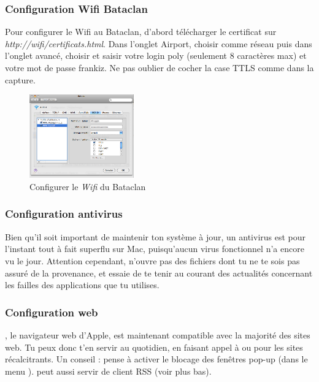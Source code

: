 
\subsubsection{Configuration Wifi Bataclan}
Pour configurer le Wifi au Bataclan, d'abord télécharger le certificat sur \emph{http://wifi/certificats.html}.
Dans l'onglet Airport, choisir comme réseau  puis dans l'onglet avancé, choisir  et saisir votre login poly (seulement 8 caractères max) et votre mot de passe frankiz. Ne pas oublier de cocher la case TTLS comme dans la capture.

\begin{figure}[!hl]
    \begin{center}
      \includegraphics[width=0.4\textwidth]{images/mac_config_wifi.png} 
      \caption{Configurer le \emph{Wifi} du Bataclan}
    \end{center}
  \end{figure}


\subsubsection{Configuration antivirus}

Bien qu'il soit important de maintenir ton système à jour, un antivirus est pour l'instant tout à fait superflu sur Mac, puisqu'aucun virus fonctionnel n'a encore vu le jour. Attention cependant, n'ouvre pas des fichiers dont tu ne te sois pas assuré de la provenance, et essaie de te tenir au courant des actualités concernant les failles des applications que tu utilises.


\subsubsection{Configuration web}

 , le navigateur web d'Apple, est maintenant compatible avec la majorité des sites web. Tu peux donc t'en servir au quotidien, en faisant appel à  ou  pour les sites récalcitrants. Un conseil : pense à activer le blocage des fenêtres pop-up (dans le menu ).  peut aussi servir de client RSS (voir plus bas).\\


